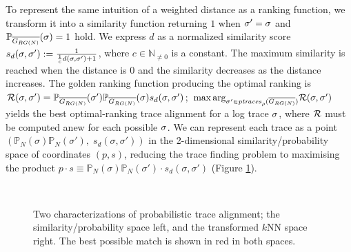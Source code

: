 To represent the same intuition of a weighted distance as a ranking function, we transform it into a
similarity function returning $1$ when $\nonlogtrace=\logtrace$ and $\probskip{\logtrace}=1$ hold. We express $d$ as
a normalized similarity score $s_d(\logtrace,\nonlogtrace):=\frac{1}{\frac{1}{c}d(\logtrace,\nonlogtrace)+1}$, where  
$c\in\mathbb{N}_{\neq0}$ is a constant. The maximum similarity is reached when the distance is $0$ and the similarity decreases 
as the distance increases. 
 The golden ranking function producing the optimal ranking is 
 $\goldenrank(\logtrace,\nonlogtrace)=\probskip{\nonlogtrace} \probskip{\logtrace} s_d(\logtrace,\nonlogtrace)$;
${\max\arg}_{\nonlogtrace\in \WCal{\pmin}{n}} \goldenrank(\logtrace,{\nonlogtrace})$ yields the best optimal-ranking trace 
alignment for a log trace $\logtrace$, where $\goldenrank$ must be computed anew for each possible $\logtrace$. 
{We can represent each trace as a point  $(\mathbb{P}_N(\sigma)\mathbb{P}_N(\sigma'),\; s_d(\sigma,\sigma'))$ in the 
2-dimensional similarity/probability space of coordinates $(p,s)$, reducing the trace finding problem to maximising the product 
$p\cdot s\equiv \mathbb{P}_N(\sigma)\mathbb{P}_N(\sigma')\cdot s_d(\sigma,\sigma')$ (Figure \ref{fig:sps}).}
%
\begin{figure}[!t]
	\centering
	\\
	\caption{Two characterizations of probabilistic trace alignment; the similarity/probability space left, and the transformed
	$k$NN space right. The best possible match is shown in red in both spaces.}\label{fig:sps}
\end{figure}



